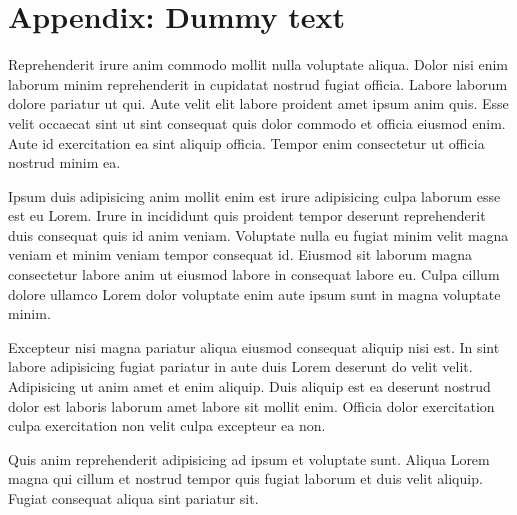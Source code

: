 \section{Appendix: Dummy text}\label{app:dummy-text}
Reprehenderit irure anim commodo mollit nulla voluptate aliqua. Dolor nisi enim laborum minim reprehenderit in cupidatat nostrud fugiat officia. Labore laborum dolore pariatur ut qui. Aute velit elit labore proident amet ipsum anim quis. Esse velit occaecat sint ut sint consequat quis dolor commodo et officia eiusmod enim. Aute id exercitation ea sint aliquip officia. Tempor enim consectetur ut officia nostrud minim ea.

Ipsum duis adipisicing anim mollit enim est irure adipisicing culpa laborum esse est eu Lorem. Irure in incididunt quis proident tempor deserunt reprehenderit duis consequat quis id anim veniam. Voluptate nulla eu fugiat minim velit magna veniam et minim veniam tempor consequat id. Eiusmod sit laborum magna consectetur labore anim ut eiusmod labore in consequat labore eu. Culpa cillum dolore ullamco Lorem dolor voluptate enim aute ipsum sunt in magna voluptate minim.

Excepteur nisi magna pariatur aliqua eiusmod consequat aliquip nisi est. In sint labore adipisicing fugiat pariatur in aute duis Lorem deserunt do velit velit. Adipisicing ut anim amet et enim aliquip. Duis aliquip est ea deserunt nostrud dolor est laboris laborum amet labore sit mollit enim. Officia dolor exercitation culpa exercitation non velit culpa excepteur ea non.

Quis anim reprehenderit adipisicing ad ipsum et voluptate sunt. Aliqua Lorem magna qui cillum et nostrud tempor quis fugiat laborum et duis velit aliquip. Fugiat consequat aliqua sint pariatur sit.